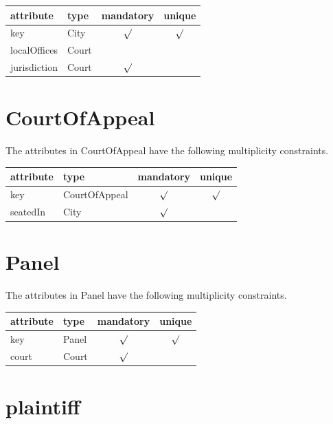 \documentclass[10pt,a4paper]{report}              %
\theoremstyle{plain}\theorembodyfont{\rmfamily}\newtheorem{definition}{Definition}[section]
\theoremstyle{plain}\theorembodyfont{\rmfamily}\newtheorem{designrule}[definition]{Requirement}
\begin{document}
\begin{center}
\begin{tabular}{llcc}
attribute & type & mandatory & unique\\
\hline
key  & City & $\surd$ & $\surd$\\
localOffices & Court &  & \\
jurisdiction & Court & $\surd$ & \\
\end{tabular}
\end{center}

\section{CourtOfAppeal}

\label{sct:plug CourtOfAppeal}

The attributes in CourtOfAppeal have the following multiplicity constraints. 

\begin{center}
\begin{tabular}{llcc}
attribute & type & mandatory & unique\\
\hline
key  & CourtOfAppeal & $\surd$ & $\surd$\\
seatedIn & City & $\surd$ & \\
\end{tabular}
\end{center}

\section{Panel}

\label{sct:plug Panel}

The attributes in Panel have the following multiplicity constraints. 

\begin{center}
\begin{tabular}{llcc}
attribute & type & mandatory & unique\\
\hline
key  & Panel & $\surd$ & $\surd$\\
court & Court & $\surd$ & \\
\end{tabular}
\end{center}

\section{plaintiff}
\end{document}
